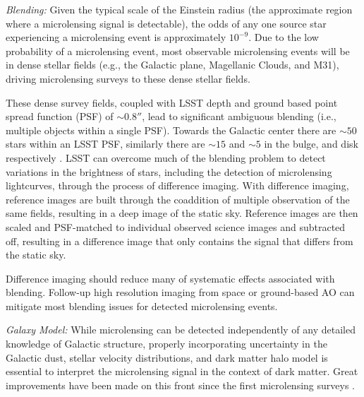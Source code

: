 \emph{Blending:} Given the typical scale  of the Einstein radius (the approximate region where a microlensing signal is detectable), the odds of any one source star experiencing a microlensing event is approximately $10^{-9}$. Due to the low probability of a microlensing event, most observable microlensing events will be in dense stellar fields (e.g., the Galactic plane, Magellanic Clouds, and M31), driving microlensing surveys to these dense stellar fields.

These dense survey fields, coupled with LSST depth and ground based point spread function (PSF) of $\sim0.8''$, lead to significant ambiguous blending (i.e., multiple objects within a single PSF).
Towards the Galactic center there are $\sim50$ stars within an LSST PSF, similarly there are $\sim15$ and $\sim5$ in the bulge, and disk respectively \citep{1806.06372}.
LSST can overcome much of the blending problem to detect variations in the brightness of stars, including the detection of microlensing lightcurves, through the process of difference imaging.
With difference imaging, reference images are built through the coaddition of multiple observation of the same fields, resulting in a deep image of the static sky. Reference images are then scaled and PSF-matched to individual observed science images and subtracted off, resulting in a difference image that only contains the signal that differs from the static sky. 

Difference imaging should reduce many of systematic effects associated with blending. Follow-up high resolution imaging from space or ground-based AO can mitigate most blending issues for detected microlensing events.

\emph{Galaxy Model:} While microlensing can be detected independently of any detailed knowledge of Galactic structure, properly incorporating uncertainty in the Galactic dust, stellar velocity distributions, and dark matter halo model is essential to interpret the microlensing signal in the context of dark matter.
Great improvements have been made on this front since the first microlensing surveys \citep[e.g.,][]{2018MNRAS.479.2889C}.



